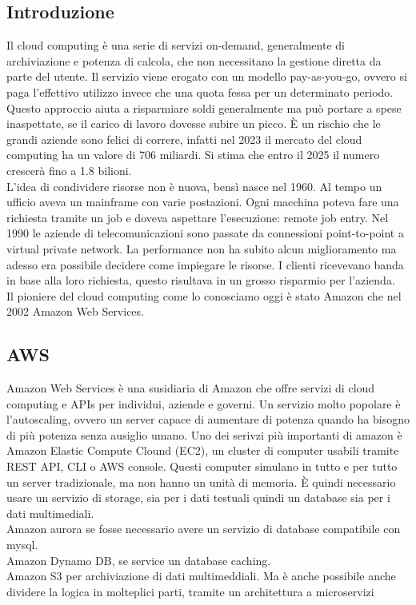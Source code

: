 \documentclass[12pt]{article}
\begin{document}
\subsection{Introduzione}
Il cloud computing è una serie di servizi on-demand, generalmente di archiviazione 
e potenza di calcola, che non necessitano la gestione diretta da parte del utente. 
Il servizio viene erogato con un modello pay-as-you-go, ovvero si paga l'effettivo 
utilizzo invece che una quota fessa per un determinato periodo. 
Questo approccio aiuta a risparmiare soldi generalmente ma può portare a spese 
inaspettate, se il carico di lavoro dovesse subire un picco.
È un rischio che le grandi aziende sono felici di correre, infatti nel 2023 il 
mercato del cloud computing ha un valore di 706 miliardi. Si stima che entro il 
2025 il numero crescerà fino a 1.8 bilioni. 
\\ L'idea di condividere risorse non è nuova, bensì nasce nel 1960. Al tempo 
un ufficio aveva un mainframe con varie postazioni. Ogni macchina poteva fare 
una richiesta tramite un job e doveva aspettare l'esecuzione: remote job entry.
Nel 1990 le aziende di telecomunicazioni sono passate da connessioni 
point-to-point a virtual private network.
La performance non ha subito alcun miglioramento ma adesso era possibile 
decidere come impiegare le risorse. I clienti ricevevano banda in base 
alla loro richiesta, questo risultava in un grosso risparmio per l'azienda.
\\ Il pioniere del cloud computing come lo conosciamo oggi è stato Amazon che 
nel 2002 Amazon Web Services.

\subsection{AWS}
Amazon Web Services è una susidiaria di Amazon che offre servizi di cloud 
computing e APIs per individui, aziende e governi.
Un servizio molto popolare è l'autoscaling, ovvero un server capace di aumentare 
di potenza quando ha bisogno di più potenza senza ausiglio umano. 
Uno dei serivzi più importanti di amazon è Amazon Elastic Compute Clound (EC2), 
un cluster di computer usabili tramite REST API, CLI o AWS console. Questi 
computer simulano in tutto e per tutto un server tradizionale, ma non hanno 
un unità di memoria. 
È quindi necessario usare un servizio di storage, sia per i dati testuali 
quindi un database sia per i dati multimediali. 
\\ Amazon aurora se fosse necessario avere un servizio di database compatibile 
con mysql. 
\\ Amazon Dynamo DB, se service un database caching. 
\\ Amazon S3 per archiviazione di dati multimeddiali.
Ma è anche possibile anche dividere la logica in molteplici parti, tramite un 
architettura a microservizi
\end{document}
